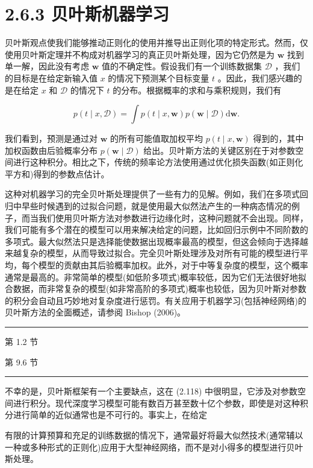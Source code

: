\documentclass[10pt]{article}
\newcommand{\HRule}{\begin{center}\rule{0.9\linewidth}{0.2mm}\end{center}}
\begin{document}
\section*{2.6.3 贝叶斯机器学习}

贝叶斯观点使我们能够推动正则化的使用并推导出正则化项的特定形式。然而，仅使用贝叶斯定理并不构成对机器学习的真正贝叶斯处理，因为它仍然是为 \(\mathbf{w}\) 找到单一解，因此没有考虑 \(\mathbf{w}\) 值的不确定性。假设我们有一个训练数据集 \(\mathcal{D}\) ，我们的目标是在给定新输入值 \(x\) 的情况下预测某个目标变量 \(t\) 。因此，我们感兴趣的是在给定 \(x\) 和 \(\mathcal{D}\) 的情况下 \(t\) 的分布。根据概率的求和与乘积规则，我们有

\[
p\left( {t \mid  x,\mathcal{D}}\right)  = \int p\left( {t \mid  x,\mathbf{w}}\right) p\left( {\mathbf{w} \mid  \mathcal{D}}\right) \mathrm{d}\mathbf{w}. \tag{2.118}
\]

我们看到，预测是通过对 \(\mathbf{w}\) 的所有可能值取加权平均 \(p\left( {t \mid  x,\mathbf{w}}\right)\) 得到的，其中加权函数由后验概率分布 \(p\left( {\mathbf{w} \mid  \mathcal{D}}\right)\) 给出。贝叶斯方法的关键区别在于对参数空间进行这种积分。相比之下，传统的频率论方法使用通过优化损失函数(如正则化平方和)得到的参数点估计。

这种对机器学习的完全贝叶斯处理提供了一些有力的见解。例如，我们在多项式回归中早些时候遇到的过拟合问题，就是使用最大似然法产生的一种病态情况的例子，而当我们使用贝叶斯方法对参数进行边缘化时，这种问题就不会出现。同样，我们可能有多个潜在的模型可以用来解决给定的问题，比如回归示例中不同阶数的多项式。最大似然法只是选择能使数据出现概率最高的模型，但这会倾向于选择越来越复杂的模型，从而导致过拟合。完全贝叶斯处理涉及对所有可能的模型进行平均，每个模型的贡献由其后验概率加权。此外，对于中等复杂度的模型，这个概率通常是最高的。非常简单的模型(如低阶多项式)概率较低，因为它们无法很好地拟合数据，而非常复杂的模型(如非常高阶的多项式)概率也较低，因为贝叶斯对参数的积分会自动且巧妙地对复杂度进行惩罚。有关应用于机器学习(包括神经网络)的贝叶斯方法的全面概述，请参阅 Bishop (2006)。

\HRule

第 1.2 节

第 9.6 节

\HRule

不幸的是，贝叶斯框架有一个主要缺点，这在 (2.118) 中很明显，它涉及对参数空间进行积分。现代深度学习模型可能有数百万甚至数十亿个参数，即使是对这种积分进行简单的近似通常也是不可行的。事实上，在给定

有限的计算预算和充足的训练数据的情况下，通常最好将最大似然技术(通常辅以一种或多种形式的正则化)应用于大型神经网络，而不是对小得多的模型进行贝叶斯处理。
\end{document}
